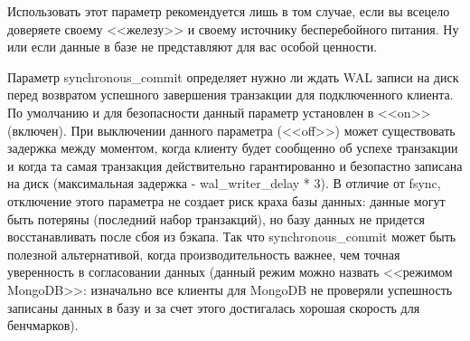 Использовать этот параметр рекомендуется лишь в том случае, если вы всецело доверяете своему <<железу>> и своему источнику
бесперебойного питания. Ну или если данные в базе не представляют для вас особой ценности.

Параметр synchronous\_commit определяет нужно ли ждать WAL записи на диск перед возвратом успешного завершения транзакции для подключенного клиента. По умолчанию и для безопасности данный параметр установлен в <<on>> (включен). При выключении данного параметра (<<off>>) может существовать задержка между моментом, когда клиенту будет сообщенно об успехе транзакции и когда та самая транзакция действительно гарантированно и безопастно записана на диск (максимальная задержка - wal\_writer\_delay * 3). В отличие от fsync, отключение этого параметра не создает риск краха базы данных: данные могут быть потеряны (последний набор транзакций), но базу данных не придется восстанавливать после сбоя из бэкапа. Так что synchronous\_commit может быть полезной альтернативой, когда производительность важнее, чем точная уверенность в согласовании данных (данный режим можно назвать <<режимом MongoDB>>: изначально все клиенты для MongoDB не проверяли успешность записаны данных в базу и за счет этого достигалась хорошая скорость для бенчмарков).

